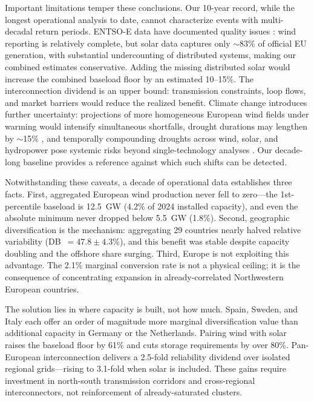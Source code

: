 \documentclass[sn-nature]{sn-jnl}%
\begin{document}
Important limitations temper these conclusions. Our 10-year record, while the longest operational analysis to date, cannot characterize events with multi-decadal return periods. ENTSO-E data have documented quality issues \cite{hirth2018}: wind reporting is relatively complete, but solar data captures only $\sim$83\% of official EU generation, with substantial undercounting of distributed systems, making our combined estimates conservative. Adding the missing distributed solar would increase the combined baseload floor by an estimated 10--15\%. The interconnection dividend is an upper bound: transmission constraints, loop flows, and market barriers would reduce the realized benefit. Climate change introduces further uncertainty: projections of more homogeneous European wind fields under warming \cite{wohland_more_2017,tobin2015} would intensify simultaneous shortfalls, drought durations may lengthen by $\sim$15\% \cite{qu2025}, and temporally compounding droughts across wind, solar, and hydropower pose systemic risks beyond single-technology analyses \cite{vandermost2024}. Our decade-long baseline provides a reference against which such shifts can be detected.

Notwithstanding these caveats, a decade of operational data establishes three facts. First, aggregated European wind production never fell to zero---the 1st-percentile baseload is \SI{12.5}{\giga\watt} (4.2\% of 2024 installed capacity), and even the absolute minimum never dropped below \SI{5.5}{\giga\watt} (1.8\%). Second, geographic diversification is the mechanism: aggregating 29 countries nearly halved relative variability (DB~$= 47.8 \pm 4.3$\%), and this benefit was stable despite capacity doubling and the offshore share surging. Third, Europe is not exploiting this advantage. The 2.1\% marginal conversion rate is not a physical ceiling; it is the consequence of concentrating expansion in already-correlated Northwestern European countries.

The solution lies in where capacity is built, not how much. Spain, Sweden, and Italy each offer an order of magnitude more marginal diversification value than additional capacity in Germany or the Netherlands. Pairing wind with solar raises the baseload floor by 61\% and cuts storage requirements by over 80\%. Pan-European interconnection delivers a 2.5-fold reliability dividend over isolated regional grids---rising to 3.1-fold when solar is included. These gains require investment in north-south transmission corridors and cross-regional interconnectors, not reinforcement of already-saturated clusters.
\end{document}
